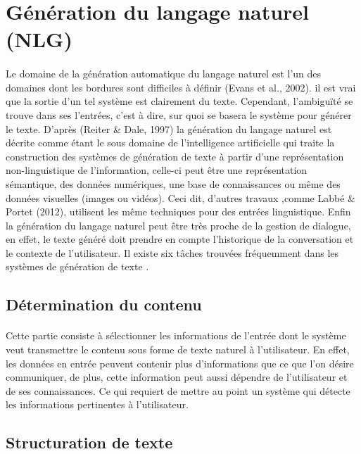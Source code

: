 \section{Génération du langage naturel (NLG)}\label{NLG}
	\paragraph{}
	Le domaine de la génération automatique du langage naturel est l’un des domaines dont les bordures sont difficiles à définir (Evans et al., 2002). il est vrai que la sortie d’un tel système est clairement du texte. Cependant, l’ambiguïté se trouve dans ses l’entrées, c’est à dire, sur quoi se basera le système pour générer le texte. D’après (Reiter \& Dale, 1997)\cite{Reiter:1997} la génération du langage naturel est décrite comme étant le sous domaine de l’intelligence artificielle qui traite la construction des systèmes de génération de texte à partir d’une représentation non-linguistique de l’information, celle-ci peut être une représentation sémantique, des données numériques, une base de connaissances ou même des données visuelles (images ou vidéos). Ceci dit, d’autres travaux ,comme Labbé \& Portet (2012)\cite{Labbé2012}, utilisent les même techniques pour des entrées linguistique. Enfin la génération du langage naturel peut être très proche de la gestion de dialogue\cite{Dethlefs2014}, en effet, le texte généré doit prendre en compte l’historique de la conversation et le contexte de l’utilisateur.\newline
	Il existe six tâches trouvées fréquemment dans les systèmes de génération de texte \cite{Reiter:1997}.
	
	\subsection{Détermination du contenu}
	\paragraph{}
	Cette partie consiste à sélectionner les informations de l’entrée dont le système veut transmettre le contenu sous forme de texte naturel à l’utilisateur. En effet, les données en entrée peuvent contenir plus d’informations que ce que l’on désire communiquer\cite{Yu:2007}, de plus, cette information peut aussi dépendre de l’utilisateur et de ses connaissances\cite{Dethlefs2014}. Ce qui requiert de mettre au point un système qui détecte les informations pertinentes à l’utilisateur.
	\subsection{Structuration de texte}

